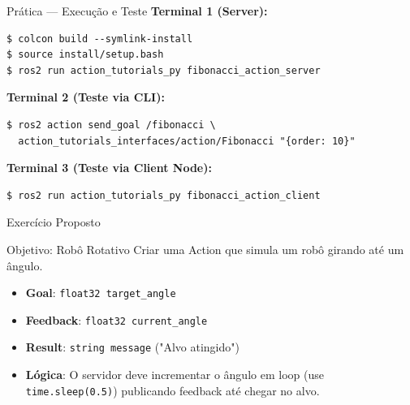 \begin{frame}[fragile]{Prática — Execução e Teste}
\textbf{Terminal 1 (Server):}
\begin{lstlisting}[style=bashstyle]
$ colcon build --symlink-install
$ source install/setup.bash
$ ros2 run action_tutorials_py fibonacci_action_server
\end{lstlisting}

\vspace{0.5em}
\textbf{Terminal 2 (Teste via CLI):}
\begin{lstlisting}[style=bashstyle]
$ ros2 action send_goal /fibonacci \
  action_tutorials_interfaces/action/Fibonacci "{order: 10}"
\end{lstlisting}

\vspace{0.5em}
\textbf{Terminal 3 (Teste via Client Node):}
\begin{lstlisting}[style=bashstyle]
$ ros2 run action_tutorials_py fibonacci_action_client
\end{lstlisting}
\end{frame}

\begin{frame}[fragile]{Exercício Proposto}
  \begin{block}{Objetivo: Robô Rotativo}
    Criar uma Action que simula um robô girando até um ângulo.
  \end{block}
  \begin{itemize}
    \item \textbf{Goal}: \texttt{float32 target\_angle}
    \item \textbf{Feedback}: \texttt{float32 current\_angle}
    \item \textbf{Result}: \texttt{string message} ("Alvo atingido")
    \item \textbf{Lógica}: O servidor deve incrementar o ângulo em loop (use \texttt{time.sleep(0.5)}) publicando feedback até chegar no alvo.
  \end{itemize}
\end{frame}

